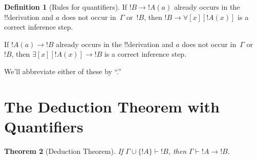 \documentclass[10pt,a4paper]{article}
\theoremstyle{plain}
\newtheorem{thm}{Theorem}[section]
\theoremstyle{definition}
\newtheorem{defn}[thm]{Definition}
\theoremstyle{remark}
\newcommand*{\olfileid}[3]{}
\newcommand*{\olsection}[1]{\section*{#1}}
\newcommand*{\ollabel}[1]{\label{#1}}
\providecommand{\lif}{\mathbin{\rightarrow}}
\providecommand{\lforall}{\mathord{\forall}}
\providecommand{\lexists}{\mathord{\exists}}
\providecommand{\Proves}{\mathrel{\vdash}}
\providecommand{\QR}{\mathrm{QR}}
\begin{document}
\begin{defn}[Rules for quantifiers]
\item If $!B \lif !A(a)$ already occurs in the !!{derivation} and $a$
  does not occur in~$\Gamma$ or~$!B$, then $!B \lif
  \lforall[x][!A(x)]$ is a correct inference step.
\item If $!A(a) \lif !B$ already occurs in the !!{derivation} and $a$
  does not occur in~$\Gamma$ or~$!B$, then $\lexists[x][!A(x)] \lif
  !B$ is a correct inference step.
\end{defn}

We'll abbreviate either of these by ``\QR.''





\olfileid{fol}{axd}{ddq}

\olsection{The Deduction Theorem with Quantifiers}

\begin{thm}[Deduction Theorem]
\ollabel{thm:deduction-thm-q} If $\Gamma \cup \{!A\} \Proves !B$,
then $\Gamma \Proves !A \lif !B$.
\end{thm}
\end{document}
